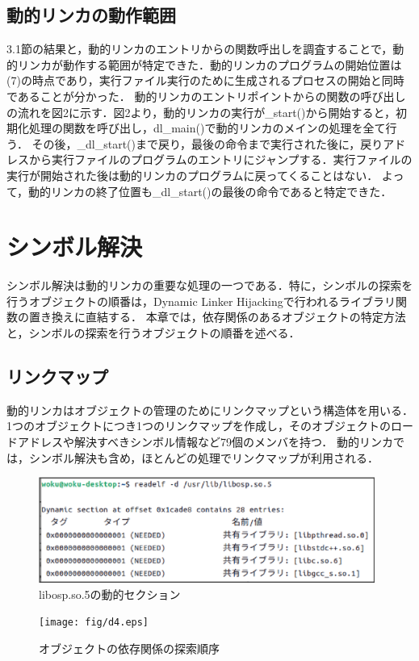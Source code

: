 \documentclass[submit,techreq,noauthor,dvipdfmx]{mid-eco}
\begin{document}
\subsection{動的リンカの動作範囲}
3.1節の結果と，動的リンカのエントリからの関数呼出しを調査することで，動的リンカが動作する範囲が特定できた．動的リンカのプログラムの開始位置は(7)の時点であり，実行ファイル実行のために生成されるプロセスの開始と同時であることが分かった．
動的リンカのエントリポイントからの関数の呼び出しの流れを図2に示す．図2より，動的リンカの実行が\_start()から開始すると，初期化処理の関数を呼び出し，dl\_main()で動的リンカのメインの処理を全て行う．
その後，\_dl\_start()まで戻り，最後の命令まで実行された後に，戻りアドレスから実行ファイルのプログラムのエントリにジャンプする．実行ファイルの実行が開始された後は動的リンカのプログラムに戻ってくることはない．
よって，動的リンカの終了位置も\_dl\_start()の最後の命令であると特定できた．\\

\section{シンボル解決}
シンボル解決は動的リンカの重要な処理の一つである．特に，シンボルの探索を行うオブジェクトの順番は，Dynamic Linker Hijackingで行われるライブラリ関数の置き換えに直結する．
本章では，依存関係のあるオブジェクトの特定方法と，シンボルの探索を行うオブジェクトの順番を述べる．
\subsection{リンクマップ}
動的リンカはオブジェクトの管理のためにリンクマップという構造体を用いる．
1つのオブジェクトにつき1つのリンクマップを作成し，そのオブジェクトのロードアドレスや解決すべきシンボル情報など79個のメンバを持つ．
動的リンカでは，シンボル解決も含め，ほとんどの処理でリンクマップが利用される．


\begin{figure}[t]
	\centering
  \includegraphics[width=11cm]{fig/d3.eps}
	\caption{libosp.so.5の動的セクション}
	\label{fig:d2}
\end{figure}

\begin{figure}[t]
	\centering
  \texttt{[image: fig/d4.eps]}
	\caption{オブジェクトの依存関係の探索順序}
	\label{fig:d2}
\end{figure}
\end{document}
